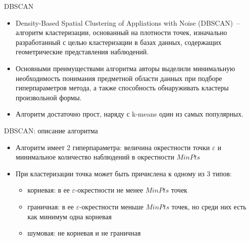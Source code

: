 \documentclass{beamer}
\begin{document}
\begin{frame}{DBSCAN}
    \small
    
    \begin{itemize}
        \item Density-Based Spatial Clustering of Appliations with Noise (DBSCAN)~-- алгоритм кластеризации, основанный на плотности точек, изначально разработанный с целью кластеризации в базах данных, содержащих геометрические представления наблюдений.
        \item Основными преимуществами алгоритма авторы выделили минимальную необходимость понимания предметной области данных при подборе гиперпараметров метода, а также способность обнаруживать кластеры произвольной формы.
        \item Алгоритм достаточно прост, наряду с k-means один из самых популярных.
    \end{itemize}
\end{frame}

\begin{frame}{DBSCAN: описание алгоритма}
    \small
    
     \begin{itemize}
        \item Алгоритм имеет 2 гиперпараметра: величина окрестности точки $\varepsilon$ и минимальное количество наблюдений в окрестности $MinPts$
        \item При кластеризации точка может быть причислена к одному из 3 типов: 
            \begin{itemize}
                \item корневая: в ее $\varepsilon$-окрестности не менее $MinPts$ точек
                \item граничная: в ее $\varepsilon$-окрестности меньше $MinPts$ точек, но среди них есть как минимум одна корневая
                \item шумовая: не корневая и не граничная
            \end{itemize}
        \end{itemize}
\end{frame}
\end{document}
